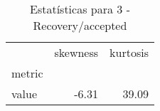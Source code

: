 \begin{table}[htbp]
\caption{Estatísticas para 3 - Recovery/accepted}
\label{tab:3_-_recovery_accepted_skewkurt}
\begin{tabular}{lrr}
\toprule
 & skewness & kurtosis \\
metric &  &  \\
\midrule
value & -6.31 & 39.09 \\
\bottomrule
\end{tabular}
\end{table}
